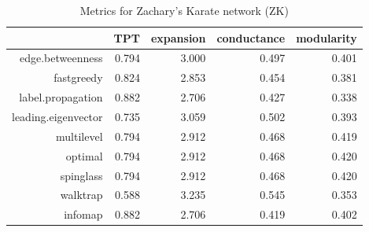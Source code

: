 \documentclass[paper=a4, fontsize=11pt]{scrartcl} %
\begin{document}
\begin{table}[ht]
\centering
\begin{tabular}{rrrrr}
  \hline
 & TPT & expansion & conductance & modularity \\ 
  \hline
edge.betweenness & 0.794 & 3.000 & 0.497 & 0.401 \\ 
  
             fastgreedy & 0.824 & 2.853 & 0.454 & 0.381 \\ 
  
             label.propagation & 0.882 & 2.706 & 0.427 & 0.338 \\ 
  
             leading.eigenvector & 0.735 & 3.059 & 0.502 & 0.393 \\ 
  
             multilevel & 0.794 & 2.912 & 0.468 & 0.419 \\ 
  
             optimal & 0.794 & 2.912 & 0.468 & 0.420 \\ 
  
             spinglass & 0.794 & 2.912 & 0.468 & 0.420 \\ 
  
             walktrap & 0.588 & 3.235 & 0.545 & 0.353 \\ 
  
             infomap & 0.882 & 2.706 & 0.419 & 0.402 \\ 
   \hline
\end{tabular}
\caption{Metrics for Zachary's Karate network (ZK)} 
\end{table}

\newpage
\end{document}
